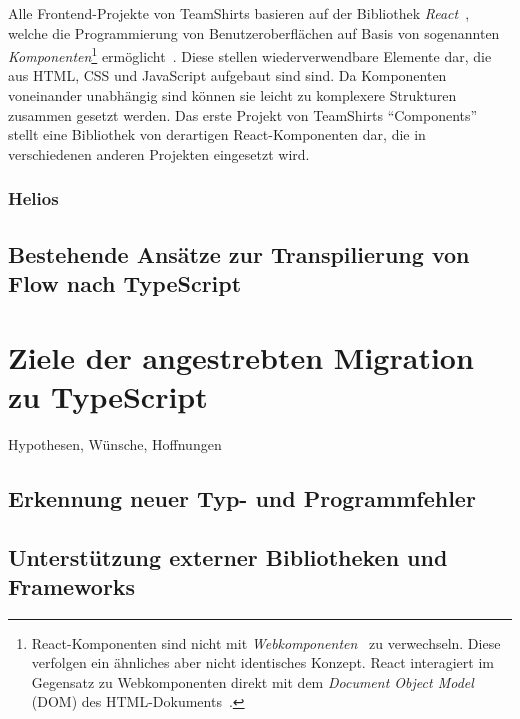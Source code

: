 Alle Frontend-Projekte von TeamShirts basieren auf der Bibliothek \textit{React}~\autocite{SOFTWARE:REACT}, welche die Programmierung von Benutzeroberflächen auf Basis von sogenannten \emph{Komponenten}\footnote{React-Komponenten sind nicht mit \textit{Webkomponenten}~\autocite{MDN:WEBCOMPONENTS} zu verwechseln. Diese verfolgen ein ähnliches aber nicht identisches Konzept. React interagiert im Gegensatz zu Webkomponenten direkt mit dem \textit{Document Object Model} (DOM) des HTML-Dokuments~\autocite{REACT:WEBCOMPONENTS}.} ermöglicht~\autocite{ACM:REACT}. Diese stellen wiederverwendbare Elemente dar, die aus HTML, CSS und JavaScript aufgebaut sind sind. Da Komponenten voneinander unabhängig sind können sie leicht zu komplexere Strukturen zusammen gesetzt werden. Das erste Projekt von TeamShirts \enquote{Components} stellt eine Bibliothek von derartigen React-Komponenten dar, die in verschiedenen anderen Projekten eingesetzt wird.

\subsubsection{Helios}




\subsection{Bestehende Ansätze zur Transpilierung von Flow nach TypeScript}






\section{Ziele der angestrebten Migration zu TypeScript}
\label{analysis:goals}

Hypothesen, Wünsche, Hoffnungen

  \subsection{Erkennung neuer Typ- und Programmfehler}
  \subsection{Unterstützung externer Bibliotheken und Frameworks}
